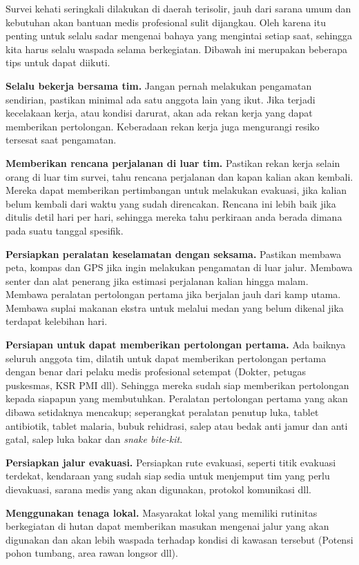 \documentclass[
  oneside]{book}
\begin{document}
Survei kehati seringkali dilakukan di daerah terisolir, jauh dari sarana umum dan kebutuhan akan bantuan medis profesional sulit dijangkau. Oleh karena itu penting untuk selalu sadar mengenai bahaya yang mengintai setiap saat, sehingga kita harus selalu waspada selama berkegiatan. Dibawah ini merupakan beberapa tips untuk dapat diikuti.

\textbf{Selalu bekerja bersama tim.} Jangan pernah melakukan pengamatan sendirian, pastikan minimal ada satu anggota lain yang ikut. Jika terjadi kecelakaan kerja, atau kondisi darurat, akan ada rekan kerja yang dapat memberikan pertolongan. Keberadaan rekan kerja juga mengurangi resiko tersesat saat pengamatan.

\textbf{Memberikan rencana perjalanan di luar tim.} Pastikan rekan kerja selain orang di luar tim survei, tahu rencana perjalanan dan kapan kalian akan kembali. Mereka dapat memberikan pertimbangan untuk melakukan evakuasi, jika kalian belum kembali dari waktu yang sudah direncakan. Rencana ini lebih baik jika ditulis detil hari per hari, sehingga mereka tahu perkiraan anda berada dimana pada suatu tanggal spesifik.

\textbf{Persiapkan peralatan keselamatan dengan seksama.} Pastikan membawa peta, kompas dan GPS jika ingin melakukan pengamatan di luar jalur. Membawa senter dan alat penerang jika estimasi perjalanan kalian hingga malam. Membawa peralatan pertolongan pertama jika berjalan jauh dari kamp utama. Membawa suplai makanan ekstra untuk melalui medan yang belum dikenal jika terdapat kelebihan hari.

\textbf{Persiapan untuk dapat memberikan pertolongan pertama.} Ada baiknya seluruh anggota tim, dilatih untuk dapat memberikan pertolongan pertama dengan benar dari pelaku medis profesional setempat (Dokter, petugas puskesmas, KSR PMI dll). Sehingga mereka sudah siap memberikan pertolongan kepada siapapun yang membutuhkan. Peralatan pertolongan pertama yang akan dibawa setidaknya mencakup; seperangkat peralatan penutup luka, tablet antibiotik, tablet malaria, bubuk rehidrasi, salep atau bedak anti jamur dan anti gatal, salep luka bakar dan \emph{snake bite-kit}.

\textbf{Persiapkan jalur evakuasi.} Persiapkan rute evakuasi, seperti titik evakuasi terdekat, kendaraan yang sudah siap sedia untuk menjemput tim yang perlu dievakuasi, sarana medis yang akan digunakan, protokol komunikasi dll.

\textbf{Menggunakan tenaga lokal.} Masyarakat lokal yang memiliki rutinitas berkegiatan di hutan dapat memberikan masukan mengenai jalur yang akan digunakan dan akan lebih waspada terhadap kondisi di kawasan tersebut (Potensi pohon tumbang, area rawan longsor dll).
\end{document}

